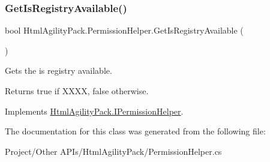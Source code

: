 \subsubsection{\texorpdfstring{Get\+Is\+Registry\+Available()}{GetIsRegistryAvailable()}}
{\footnotesize\ttfamily bool Html\+Agility\+Pack.\+Permission\+Helper.\+Get\+Is\+Registry\+Available (\begin{DoxyParamCaption}{ }\end{DoxyParamCaption})\hspace{0.3cm}{\ttfamily [inline]}}



Gets the is registry available. 

\begin{DoxyReturn}{Returns}
{\ttfamily true} if X\+X\+XX, {\ttfamily false} otherwise.
\end{DoxyReturn}


Implements \hyperlink{interface_html_agility_pack_1_1_i_permission_helper_a1ac2ee4504f537df82920c718d525035}{Html\+Agility\+Pack.\+I\+Permission\+Helper}.



The documentation for this class was generated from the following file\+:\begin{DoxyCompactItemize}
\item 
Project/\+Other A\+P\+Is/\+Html\+Agility\+Pack/Permission\+Helper.\+cs\end{DoxyCompactItemize}
